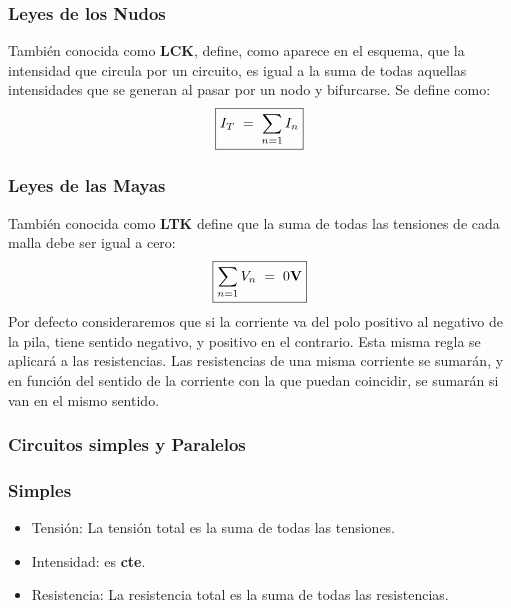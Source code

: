 \subsubsection{Leyes de los Nudos}
\begin{wrapfigure}{r}{3cm}
\end{wrapfigure}
\noindent También conocida como \textbf{LCK}, define, como aparece en el esquema, que la intensidad que circula por un circuito, es igual a la suma de todas aquellas intensidades que se generan al pasar por un nodo y bifurcarse. Se define como:
\[
        \boxed{I_T \hspace{1mm} = \hspace{1mm} \sum_{n=1}I_n}
\]
\subsubsection{Leyes de las Mayas}
\noindent También conocida como \textbf{LTK} define que la suma de todas las tensiones de cada malla debe ser igual a cero:
\[
        \boxed{\sum_{n=1}V_n \hspace{1mm} = \hspace{1mm} 0\textnormal{\textbf{V}}}
\]
\noindent Por defecto consideraremos que si la corriente va del polo positivo al negativo de la pila, tiene sentido negativo, y positivo en el contrario. Esta misma regla se aplicará a las resistencias.
Las resistencias de una misma corriente se sumarán, y en función del sentido de la corriente con la que puedan coincidir, se sumarán si van en el mismo sentido.
\subsubsection{Circuitos simples y Paralelos}
\subsubsection{Simples}
\begin{itemize}
        \item Tensión: La tensión total es la suma de todas las tensiones.
        \item Intensidad: es \textbf{cte}.
        \item Resistencia: La resistencia total es la suma de todas las resistencias.
\end{itemize}
